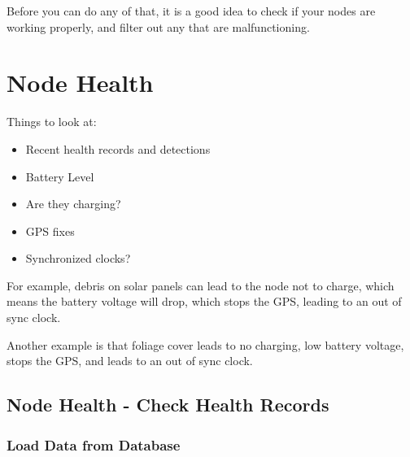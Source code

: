 \documentclass[
]{book}
\providecommand{\tightlist}{%
  \setlength{\itemsep}{0pt}\setlength{\parskip}{0pt}}
\begin{document}
Before you can do any of that, it is a good idea to check if your nodes are working properly, and filter out any that are malfunctioning.

\section{Node Health}\label{node-health}

Things to look at:

\begin{itemize}
\tightlist
\item
  Recent health records and detections
\item
  Battery Level
\item
  Are they charging?
\item
  GPS fixes
\item
  Synchronized clocks?
\end{itemize}

For example, debris on solar panels can lead to the node not to charge, which means the battery voltage will drop, which stops the GPS, leading to an out of sync clock.

Another example is that foliage cover leads to no charging, low battery voltage, stops the GPS, and leads to an out of sync clock.

\subsection{Node Health - Check Health Records}\label{node-health---check-health-records}

\subsubsection{Load Data from Database}\label{load-data-from-database}
\end{document}
